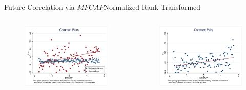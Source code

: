 \documentclass[handout]{beamer}
\begin{document}
	\begin{frame}{Future Correlation via $ MFCAP $}{Normalized Rank-Transformed}
		\label{Monthly16} 
		\begin{columns}
			\begin{figure}   
				\centering
				\includegraphics[width=\linewidth]{"Output/mcorr5bg.eps"}     \end{figure}            
			\begin{figure}
				\centering  
				\includegraphics[width=\linewidth]{"Output/mcorr5l.eps"}
			\end{figure}
		\end{columns}
		
		
	\end{frame}
	
\end{document}
